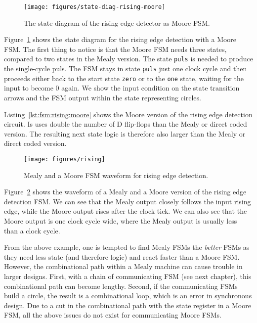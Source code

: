 \documentclass[%
    10pt,
    headinclude, footexclude,
    openright, %
    notitlepage,
    cleardoubleempty,
    headsepline,
    pointlessnumbers,
    bibtotoc, idxtotoc,
    ]{scrbook}
\newcommand{\code}[1]{{\small{\texttt{#1}}}}
\newcommand{\scale}{0.7}
\begin{document}
\begin{figure}
  \centering
  \texttt{[image: figures/state-diag-rising-moore]}
  \caption{The state diagram of the rising edge detector as Moore FSM.}
  \label{fig:diag:rising:moore}
\end{figure}

Figure~\ref{fig:diag:rising:moore} shows the state diagram for the rising
edge detection with a Moore FSM. The first thing to notice is that the Moore FSM
needs three states, compared to two states in the Mealy version.
The state \code{puls} is needed to produce the single-cycle puls.
The FSM stays in state \code{puls} just one clock cycle and then
proceeds either back to the start state \code{zero} or to the \code{one}
state, waiting for the input to become 0 again.
We show the input condition on the state transition arrows and the
FSM output within the state representing circles.


Listing~\ref{lst:fsm:rising:moore} shows the Moore version of the rising edge detection
circuit. Is uses double the number of D flip-flops than the Mealy or direct
coded version. The resulting next state logic is therefore also larger
than the Mealy or direct coded version.

\begin{figure}
  \centering
  \texttt{[image: figures/rising]}
  \caption{Mealy and a  Moore FSM waveform for rising edge detection.}
  \label{fig:rising}
\end{figure}

Figure~\ref{fig:rising} shows the waveform of a Mealy and a  Moore version
of the rising edge detection FSM. We can see that the Mealy output closely
follows the input rising edge, while the Moore output rises after the clock tick.
We can also see that the Moore output is one clock cycle wide, where the Mealy
output is usually less than a clock cycle.

From the above example, one is tempted to find Mealy FSMs the \emph{better}
FSMs as they need less state (and therefore logic) and react faster than a Moore FSM.
However, the combinational path within a Mealy machine can cause trouble in
larger designs. First, with a chain of communicating FSM (see next chapter), this
combinational path can become lengthy. Second, if the communicating FSMs build
a circle, the result is a combinational loop, which is an error in synchronous design.
Due to a cut in the combinational path with the state register in a Moore FSM,
all the above issues do not exist for communicating Moore FSMs.
\end{document}
